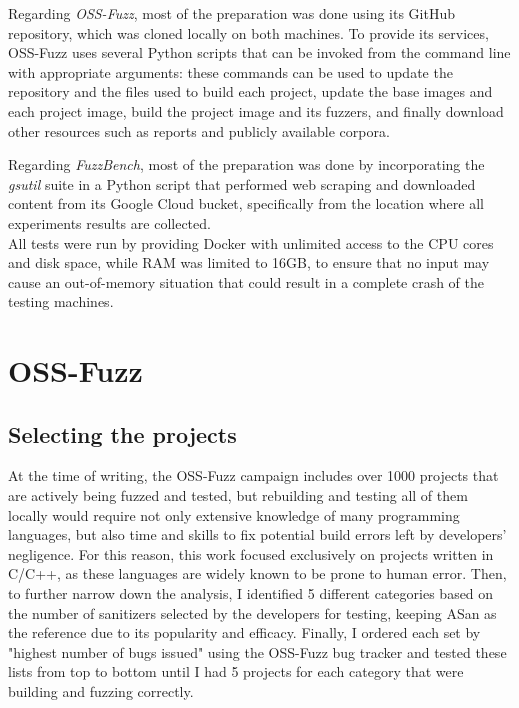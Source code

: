 Regarding \textit{OSS-Fuzz}, most of the preparation was done using its GitHub repository, which was cloned locally on both machines. To provide its services, OSS-Fuzz uses several Python scripts that can be invoked from the command line with appropriate arguments: these commands can be used to update the repository and the files used to build each project, update the base images and each project image, build the project image and its fuzzers, and finally download other resources such as reports and publicly available corpora. 

Regarding \textit{FuzzBench}, most of the preparation was done by incorporating the \textit{gsutil} suite in a Python script that performed web scraping and downloaded content from its Google Cloud bucket, specifically from the location where all experiments results are collected.
\ \\

All tests were run by providing Docker with unlimited access to the CPU cores and disk space, while RAM was limited to 16GB, to ensure that no input may cause an out-of-memory situation that could result in a complete crash of the testing machines. 


\newpage
\section{OSS-Fuzz}
\subsection{Selecting the projects} \label{selection}
At the time of writing, the OSS-Fuzz campaign includes over 1000 projects that are actively being fuzzed and tested, but rebuilding and testing all of them locally would require not only extensive knowledge of many programming languages, but also time and skills to fix potential build errors left by developers' negligence. For this reason, this work focused exclusively on projects written in C/C++, as these languages are widely known to be prone to human error. Then, to further narrow down the analysis, I identified 5 different categories based on the number of sanitizers selected by the developers for testing, keeping ASan as the reference due to its popularity and efficacy. Finally, I ordered each set by "highest number of bugs issued" using the OSS-Fuzz bug tracker and tested these lists from top to bottom until I had 5 projects for each category that were building and fuzzing correctly.

